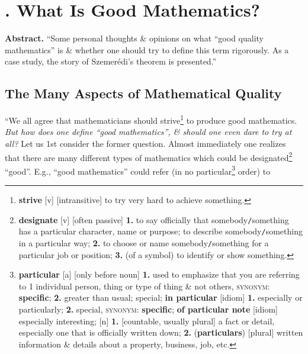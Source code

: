 \documentclass[oneside]{book}
\numberwithin{equation}{section}
\begin{document}
\section{\cite{Tao2007}. What Is Good Mathematics?}

\textbf{Abstract.} ``Some personal thoughts \& opinions on what ``good quality mathematics'' is \& whether one should try to define this term rigorously. As a case study, the story of Szemer\'edi's theorem is presented.''

\subsection{The Many Aspects of Mathematical Quality}
``We all agree that mathematicians should strive\footnote{\textbf{strive} [v] [intransitive] to try very hard to achieve something.} to produce good mathematics. \textit{But how does one define ``good mathematics'', \& should one even dare to try at all?} Let us 1st consider the former question. Almost immediately one realizes that there are many different types of mathematics which could be designated\footnote{\textbf{designate} [v] [often passive] \textbf{1.} to say officially that somebody\texttt{/}something has a particular character, name or purpose; to describe somebody\texttt{/}something in a particular way; \textbf{2.} to choose or name somebody\texttt{/}something for a particular job or position; \textbf{3.} (of a symbol) to identify or show something.} ``good''. E.g., ``good mathematics'' could refer (in no particular\footnote{\textbf{particular} [a] [only before noun] \textbf{1.} used to emphasize that you are referring to 1 individual person, thing or type of thing \& not others, \textsc{synonym}: \textbf{specific}; \textbf{2.} greater than usual; special; \textbf{in particular} [idiom] \textbf{1.} especially or particularly; \textbf{2.} special, \textsc{synonym}: \textbf{specific}; \textbf{of particular note} [idiom] especially interesting; [n] \textbf{1.} [countable, usually plural] a fact or detail, especially one that is officially written down; \textbf{2.} (\textbf{particulars}) [plural] written information \& details about a property, business, job, etc.} order) to
\end{document}
